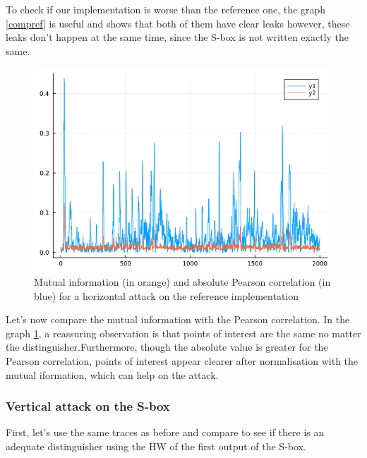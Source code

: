 \documentclass[a4paper,11pt,twocolumn]{article}
\begin{document}
		To check if our implementation is worse than the reference one, the graph \ref{compref} is useful and shows that both of them have clear leaks however, these leaks don't happen at the same time, since the S-box is not written exactly the same. 
		
		\begin{figure}[H]
			\centering
			\includegraphics[scale=0.3]{corr_vs_MI_hHW}
			\caption{Mutual information (in orange) and absolute Pearson correlation (in blue) for a horizontal attack on the reference implementation}
			\label{corvsMI}
		\end{figure}
		
		Let's now compare the mutual information with the Pearson correlation. In the graph \ref{corvsMI}, a reassuring observation is that points of interest are the same no matter the distinguisher.Furthermore, though the absolute value is greater for the Pearson correlation, points of interest appear clearer after normalisation with the mutual iformation, which can help on the attack.
		
		\subsubsection{Vertical attack on the S-box}
		First, let's use the same traces as before and compare to see if there is an adequate distinguisher using the HW of the first output of the S-box.
		
\end{document}
